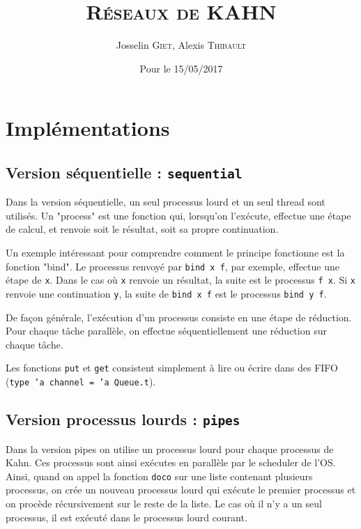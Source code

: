 \documentclass[11pt,a4paper]{article}
\title{\textsc{Réseaux de KAHN}}   %
\author{Josselin \textsc{Giet}, Alexis \textsc{Thibault}}  %
\date{Pour le 15/05/2017}    %
\renewcommand{\tt}[1]{\texttt{#1}}
\begin{document}
\maketitle

\tableofcontents





\section{Implémentations}


\subsection{Version séquentielle : \texttt{sequential}}

Dans la version séquentielle, un seul processus lourd et un seul thread sont
utilisés. Un "process" est une fonction qui, lorsqu'on l'exécute, effectue une
étape de calcul, et renvoie soit le résultat, soit sa propre continuation.

Un exemple intéressant pour comprendre comment le principe fonctionne est la
fonction "bind". Le processus renvoyé par \texttt{bind x f}, par exemple, effectue une
étape de \tt{x}. Dans le cas où \tt{x} renvoie un résultat, la suite est le processus
\tt{f x}. Si \tt{x} renvoie une continuation \tt{y}, la suite de \tt{bind x f} est le processus
\tt{bind y f}.

De façon générale, l'exécution d'un processus consiste en une étape de
réduction. Pour chaque tâche parallèle, on effectue séquentiellement une
réduction sur chaque tâche.

Les fonctions \tt{put} et \tt{get} consistent simplement à lire ou écrire dans des
FIFO (\tt{type 'a channel = 'a Queue.t}).


\subsection{Version processus lourds : \texttt{pipes}}

Dans la version pipes on utilise un processus lourd pour chaque processus
de Kahn. Ces processus sont ainsi exécutes en parallèle par le scheduler
de l'OS. Ainsi, quand on appel la fonction \tt{doco} sur une liste contenant
plusieurs processus, on crée un nouveau processus lourd qui exécute le
premier processus et on procède récursivement sur le reste de la liste.
Le cas où il n'y a un seul processus, il est exécuté dans le processus
lourd courant.
\end{document}
